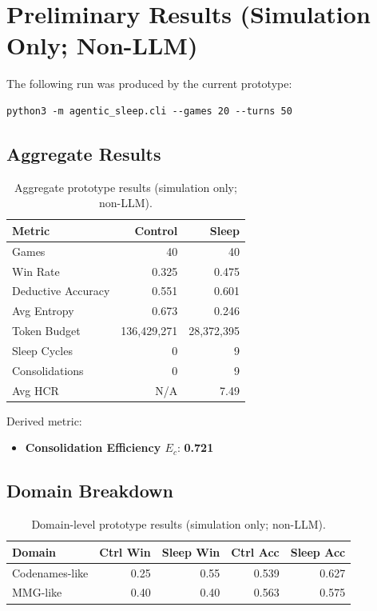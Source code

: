 \documentclass{article}
\begin{document}
\section{Preliminary Results (Simulation Only; Non-LLM)}

The following run was produced by the current prototype:

\begin{verbatim}
python3 -m agentic_sleep.cli --games 20 --turns 50
\end{verbatim}

\subsection{Aggregate Results}

\begin{table}[t]
\centering
\caption{Aggregate prototype results (simulation only; non-LLM).}
\label{tab:aggregate-results}
\begin{tabular}{lrr}
\toprule
Metric & Control & Sleep \\
\midrule
Games & 40 & 40 \\
Win Rate & 0.325 & 0.475 \\
Deductive Accuracy & 0.551 & 0.601 \\
Avg Entropy & 0.673 & 0.246 \\
Token Budget & 136,429,271 & 28,372,395 \\
Sleep Cycles & 0 & 9 \\
Consolidations & 0 & 9 \\
Avg HCR & N/A & 7.49 \\
\bottomrule
\end{tabular}
\end{table}

Derived metric:
\begin{itemize}[leftmargin=1.25em]
\item \textbf{Consolidation Efficiency $E_c$}: \textbf{0.721}
\end{itemize}

\subsection{Domain Breakdown}

\begin{table}[t]
\centering
\caption{Domain-level prototype results (simulation only; non-LLM).}
\label{tab:domain-breakdown}
\begin{tabular}{lrrrr}
\toprule
Domain & Ctrl Win & Sleep Win & Ctrl Acc & Sleep Acc \\
\midrule
Codenames-like & 0.25 & 0.55 & 0.539 & 0.627 \\
MMG-like & 0.40 & 0.40 & 0.563 & 0.575 \\
\bottomrule
\end{tabular}
\end{table}
\end{document}
